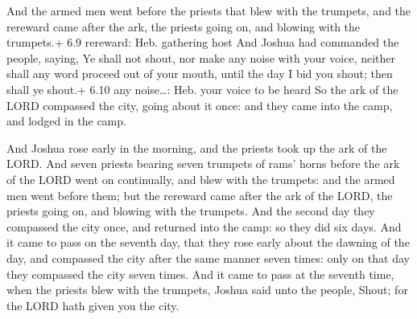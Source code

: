  And the armed men went before the priests that blew with
the trumpets, and the rereward came after the ark, the priests going on,
and blowing with the trumpets.+ 6.9 rereward: Heb. gathering host
 And Joshua had commanded the people, saying, Ye shall not
shout, nor make any noise with your voice, neither shall any word
proceed out of your mouth, until the day I bid you shout; then shall ye
shout.+ 6.10 any noise\ldots: Heb. your voice to be heard 
So the ark of the LORD compassed the city, going about it once: and they
came into the camp, and lodged in the camp.

 And Joshua rose early in the morning, and the priests
took up the ark of the LORD.  And seven priests bearing
seven trumpets of rams' horns before the ark of the LORD went on
continually, and blew with the trumpets: and the armed men went before
them; but the rereward came after the ark of the LORD, the priests going
on, and blowing with the trumpets.  And the second day they
compassed the city once, and returned into the camp: so they did six
days.  And it came to pass on the seventh day, that they
rose early about the dawning of the day, and compassed the city after
the same manner seven times: only on that day they compassed the city
seven times.  And it came to pass at the seventh time, when
the priests blew with the trumpets, Joshua said unto the people, Shout;
for the LORD hath given you the city.

